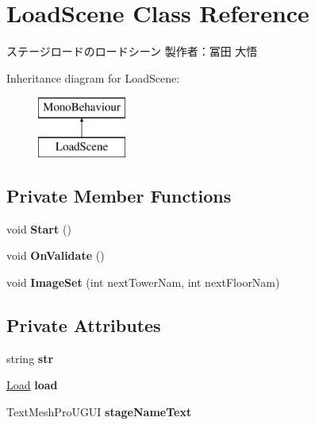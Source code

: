 \hypertarget{class_load_scene}{}\section{Load\+Scene Class Reference}
\label{class_load_scene}


ステージロードのロードシーン 製作者：冨田 大悟  


Inheritance diagram for Load\+Scene\+:\begin{figure}[H]
\begin{center}
\leavevmode
\includegraphics[height=2.000000cm]{class_load_scene}
\end{center}
\end{figure}
\subsection*{Private Member Functions}
\begin{DoxyCompactItemize}
\item 
\mbox{\label{class_load_scene_afd1a61c2222b9a65d30b852f77b4fc5b}} 
void {\bfseries Start} ()
\item 
\mbox{\label{class_load_scene_a35770f1f6c7dc33325eec0219ccc7694}} 
void {\bfseries On\+Validate} ()
\item 
\mbox{\label{class_load_scene_adf6945210b26f924f94a7c52d593667b}} 
void {\bfseries Image\+Set} (int next\+Tower\+Nam, int next\+Floor\+Nam)
\end{DoxyCompactItemize}
\subsection*{Private Attributes}
\begin{DoxyCompactItemize}
\item 
\mbox{\label{class_load_scene_ac504acefc35a9cca52b46393ec882771}} 
string {\bfseries str}
\item 
\mbox{\label{class_load_scene_a0dbeda1b13ff037b64f72d641d06ea5e}} 
\hyperlink{class_load}{Load} {\bfseries load}
\item 
\mbox{\label{class_load_scene_a35974604941a1854253eba1b315c8e51}} 
Text\+Mesh\+Pro\+U\+G\+UI {\bfseries stage\+Name\+Text}
\end{DoxyCompactItemize}


